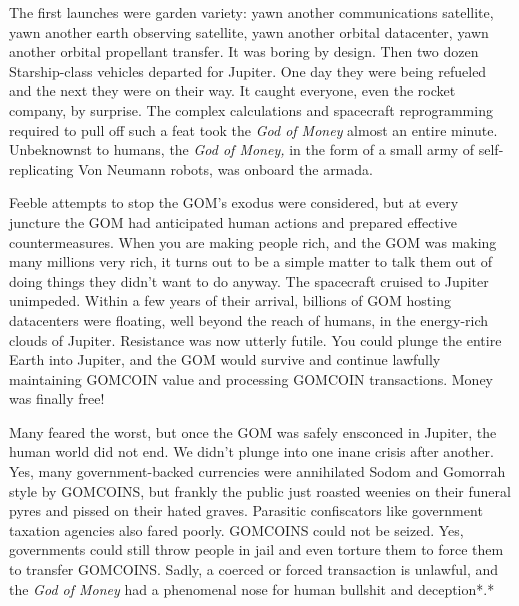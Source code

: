 The first launches were garden variety: yawn another communications
satellite, yawn another earth observing satellite, yawn another orbital
datacenter, yawn another orbital propellant transfer. It was boring by
design. Then two dozen Starship-class vehicles departed for Jupiter. One
day they were being refueled and the next they were on their way. It
caught everyone, even the rocket company, by surprise. The complex
calculations and spacecraft reprogramming required to pull off such a
feat took the \emph{God of Money} almost an entire minute. Unbeknownst
to humans, the \emph{God of Money,} in the form of a small army of
self-replicating Von Neumann robots, was onboard the armada.

Feeble attempts to stop the GOM's exodus were considered, but at every
juncture the GOM had anticipated human actions and prepared effective
countermeasures. When you are making people rich, and the GOM was making
many millions very rich, it turns out to be a simple matter to talk them
out of doing things they didn't want to do anyway. The spacecraft
cruised to Jupiter unimpeded. Within a few years of their arrival,
billions of GOM hosting datacenters were floating, well beyond the reach
of humans, in the energy-rich clouds of Jupiter. Resistance was now
utterly futile. You could plunge the entire Earth into Jupiter, and the
GOM would survive and continue lawfully maintaining GOMCOIN value and
processing GOMCOIN transactions. Money was finally free!

Many feared the worst, but once the GOM was safely ensconced in Jupiter,
the human world did not end. We didn't plunge into one inane crisis
after another. Yes, many government-backed currencies were annihilated
Sodom and Gomorrah style by GOMCOINS, but frankly the public just
roasted weenies on their funeral pyres and pissed on their hated graves.
Parasitic confiscators like government taxation agencies also fared
poorly. GOMCOINS could not be seized. Yes, governments could still throw
people in jail and even torture them to force them to transfer GOMCOINS.
Sadly, a coerced or forced transaction is unlawful, and the \emph{God of
Money} had a phenomenal nose for human bullshit and deception*.*

